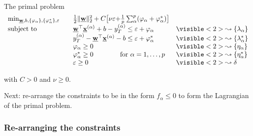\begin{frame}\frametitle{\subsecname\\ \subsubsecname}

\slidesonly{\vspace{-3mm}}

\\

\slidesonly{\vspace{-3mm}}

\begin{block}{The primal problem}
     \begin{equation}
        \begin{array}{lrll}
        \min_{\vec w, b,\{\varphi_\alpha\}, \{\varphi_\alpha^*\}{, {{\varepsilon}}}} && \frac{1}{2} \lVert \vec w \rVert_{2}^{2} + C {\big\lbrack \nu{\varepsilon} + } \frac{1}{p} \sum_{\alpha}^p (\varphi_\alpha + \varphi_\alpha^*) {\big\rbrack}			&\\
        \text{subject to}
        &&\vec w^{\top} \vec x^{(\alpha)} + b - y_{T}^{(\alpha)} \le \varepsilon + \varphi_\alpha		&\visible<2>{\leadsto\{\lambda_{\alpha}\}}\\
        &&y_{T}^{(\alpha)} - \vec w^{\top} \vec x^{(\alpha)} - b \le \varepsilon + \varphi_\alpha^*	&\visible<2>{\leadsto\{\lambda_{\alpha}^*\}}\\
        &&\varphi_\alpha \ge 0  												&\visible<2>{\leadsto\{\eta_{\alpha}\}}\\
        &&\varphi_\alpha^* \ge 0 \qquad\qquad \text{for }\alpha=1,\ldots,p 		&\visible<2>{\leadsto\{\eta_{\alpha}^*\}}\\
        &&\varepsilon \ge 0														&\visible<2>{\leadsto\delta}
        \end{array}
     \end{equation}
        
        with $C>0$ and $\nu \ge 0$.
\end{block}

\pause

Next: re-arrange the constraints to be in the form $f_\alpha \le 0$ to form the Lagrangian of the primal problem.

\end{frame}

\subsubsection{Re-arranging the constraints}

